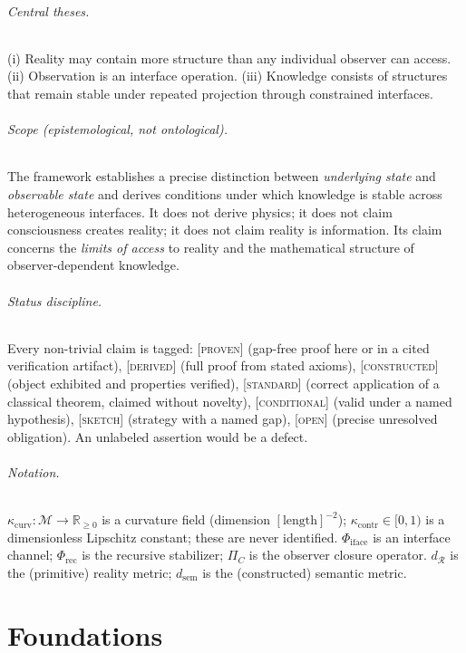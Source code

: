 \documentclass[11pt]{report}
\theoremstyle{plain}
\theoremstyle{definition}
\theoremstyle{remark}
\newcommand{\PROVEN}{\textsc{[proven]}}
\newcommand{\DERIVED}{\textsc{[derived]}}
\newcommand{\CONSTRUCTED}{\textsc{[constructed]}}
\newcommand{\STANDARD}{\textsc{[standard]}}
\newcommand{\OPENs}{\textsc{[open]}}
\newcommand{\SKETCH}{\textsc{[sketch]}}
\newcommand{\COND}{\textsc{[conditional]}}
\newcommand{\Real}{\mathcal{R}}
\newcommand{\dsem}{d_{\mathrm{sem}}}
\newcommand{\Phiface}{\Phi_{\mathrm{iface}}}
\newcommand{\Phirec}{\Phi_{\mathrm{rec}}}
\newcommand{\PiC}{\Pi_{C}}
\newcommand{\kcurv}{\kappa_{\mathrm{curv}}}
\newcommand{\kcontr}{\kappa_{\mathrm{contr}}}
\begin{document}
\paragraph{Central theses.} (i) Reality may contain more structure than any
individual observer can access. (ii) Observation is an interface operation. (iii)
Knowledge consists of structures that remain stable under repeated projection through
constrained interfaces.

\paragraph{Scope (epistemological, not ontological).} The framework establishes a
precise distinction between \emph{underlying state} and \emph{observable state} and
derives conditions under which knowledge is stable across heterogeneous interfaces. It
does not derive physics; it does not claim consciousness creates reality; it does not
claim reality is information. Its claim concerns the \emph{limits of access} to reality
and the mathematical structure of observer-dependent knowledge.

\paragraph{Status discipline.} Every non-trivial claim is tagged: \PROVEN{} (gap-free
proof here or in a cited verification artifact), \DERIVED{} (full proof from stated
axioms), \CONSTRUCTED{} (object exhibited and properties verified), \STANDARD{}
(correct application of a classical theorem, claimed without novelty), \COND{} (valid
under a named hypothesis), \SKETCH{} (strategy with a named gap), \OPENs{} (precise
unresolved obligation). An unlabeled assertion would be a defect.

\paragraph{Notation.} $\kcurv:\mathcal M\to\mathbb R_{\ge0}$ is a curvature field
(dimension $[\text{length}]^{-2}$); $\kcontr\in[0,1)$ is a dimensionless Lipschitz
constant; these are never identified. $\Phiface$ is an interface channel; $\Phirec$ is
the recursive stabilizer; $\PiC$ is the observer closure operator. $d_\Real$ is the
(primitive) reality metric; $\dsem$ is the (constructed) semantic metric.

\part{Foundations}
\end{document}
